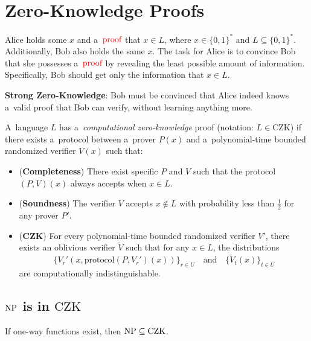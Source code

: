 
\section{Zero-Knowledge Proofs}


Alice holds some $x$ and a~$\textcolor{red}{\text{proof}}$ that $x \in L$, where $x \in \{ 0, 1 \}^{*}$ and $L \subseteq  \{ 0, 1 \}^{*}$.
Additionally, Bob also holds the same $x$.
The task for Alice is to convince Bob that she possesses a~$\textcolor{red}{\text{proof}}$ by revealing the least possible amount of information. 
Specifically, Bob should get only the information that $x \in  L$.

\textbf{Strong Zero-Knowledge}: Bob must be convinced that Alice indeed knows a~valid proof that Bob can verify, without learning anything more.

\begin{definition}
    A~language $L$ has a~\emph{computational zero-knowledge} proof (notation: $L \in \mathrm{CZK}$) if there exists a~protocol between a~prover $P(x)$ and a~polynomial-time bounded randomized verifier $V(x)$ such that:
    \begin{itemize}
        \item (\textbf{Completeness}) There exist specific $P$ and $V$ such that the protocol $(P, V)(x)$ always accepts when $x \in L$.
        
        \item (\textbf{Soundness}) The verifier $V$ accepts $x \not\in L$ with probability less than $\frac{1}{2}$ for any prover $P'$.
        
        \item (\textbf{CZK}) For every polynomial-time bounded randomized verifier $V'$, there exists an oblivious verifier $\tilde{V}$ such that for any $x \in L$, the distributions
        \[
            \{ V_r'(x, \text{protocol}(P, V_r')(x)) \}_{r \in U} \quad \text{and} \quad \{ \tilde{V}_t(x) \}_{t \in U}
        \]
        are computationally indistinguishable.
    \end{itemize}
\end{definition}

\subsection{$\operatorname{NP}$ is in $\mathrm{CZK}$}

\begin{theorem}
    If one-way functions exist, then $\operatorname{NP} \subseteq \mathrm{CZK}$.
\end{theorem}

